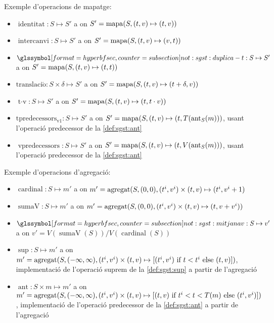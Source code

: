 Exemple d'operacions de mapatge:
\begin{itemize}
\item $\operatorname{identitat}: S \mapsto S'$ a on $S'=
  \operatorname*{mapa}(S,(t,v)\mapsto(t,v))$
\item $\operatorname{intercanvi}: S \mapsto S'$ a on $S'=
  \operatorname*{mapa}(S,(t,v)\mapsto(v,t))$
\item $\glssymbolsec{not:sgst:duplica-t}: S \mapsto S'$ a on $S'=
  \operatorname*{mapa}(S,(t,v)\mapsto(t,t))$
\item $\operatorname{translaci\acute{o}}: S \times \delta \mapsto S'$ a on $S'=
  \operatorname*{mapa}(S,(t,v)\mapsto(t+\delta,v))$
\item $\operatorname{t\cdot v}: S \mapsto S'$ a on $S'=
  \operatorname*{mapa}(S,(t,v)\mapsto(t,t\cdot v))$
\item $\operatorname{tpredecessors_{v1}}: S \mapsto S'$ a on $S'= \operatorname*{mapa}(S,(t,v)
  \mapsto (t,T(\operatorname*{ant}_S(m)))$, usant l'operació predecessor de la
  \autoref{def:sgst:ant}
\item $\operatorname{vpredecessors}: S \mapsto S'$ a on $S'= \operatorname*{mapa}(S,(t,v)
  \mapsto (t,V(\operatorname*{ant}_S(m)))$, usant l'operació predecessor de la
  \autoref{def:sgst:ant}
\end{itemize}

Exemple d'operacions d'agregació:
\begin{itemize}
\item $\operatorname{cardinal}: S \mapsto m'$ a on $m'=
  \operatorname*{agregat}(S,(0,0),(t^i,v^i)\times(t,v)\mapsto(t^i,v^i+1)$

\item $\operatorname{sumaV}: S \mapsto m'$ a on $m'=
  \operatorname*{agregat}(S,(0,0),(t^i,v^i)\times(t,v)\mapsto(t,v+v^i))$

\item $\glssymbolsec{not:sgst:mitjanav}: S \mapsto v'$ a on $v'=
  V(\operatorname{sumaV}(S)) / V(\operatorname{cardinal}(S))$ 

\item $\operatorname{sup}: S \mapsto m'$ a on $m'=
  \operatorname*{agregat}(S,(-\infty,\infty),(t^i,v^i)\times(t,v)\mapsto [(t^i,v^i)
  \text{ if } t < t^i \text{ else } (t,v) ])$, implementació de
  l'operació suprem de la \autoref{def:sgst:sup} a partir de
  l'agregació

\item $\operatorname{ant}: S \times m \mapsto m'$ a on $m'=
  \operatorname*{agregat}(S,(-\infty,\infty),(t^i,v^i)\times(t,v)\mapsto [(t,v)
  \text{ if } t^i < t < T(m) \text{ else } (t^i,v^i) ])$,
  implementació de l'operació predecessor de la \autoref{def:sgst:ant} a
  partir de l'agregació 
\end{itemize}


